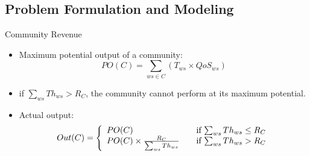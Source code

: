\documentclass{beamer}
\begin{document}
\subsection{Problem Formulation and Modeling}
\begin{frame}{Community Revenue}
    \begin{itemize}
        \item Maximum potential output of a community:
            \begin{equation*}
                PO(C) = \sum_{ws \in C}{(T_{ws} \times QoS_{ws})}
            \end{equation*}
        \item if $\sum_{ws}{Th_{ws}} > R_C$, the community cannot perform at its maximum potential.
        \item Actual output:
            \begin{equation}\label{out_c}
                Out(C) = \left\{
                  \begin{array}{l l}
                    PO(C) & \quad \text{if $\sum_{ws}{Th_{ws}} \leq R_{C}$}\\
                    PO(C) \times \frac{R_{C}}{\sum_{ws}{Th_{ws}}} & \quad \text{if $\sum_{ws}{Th_{ws}} > R_{C}$}
                  \end{array} \right.
            \end{equation}
    \end{itemize}
\end{frame}
\end{document}
